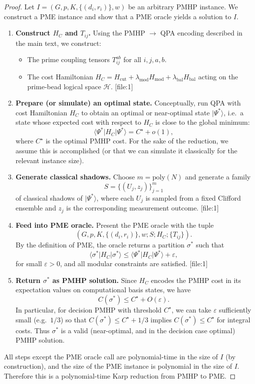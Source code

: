 \documentclass[11pt]{article}
\begin{document}
\begin{proof}
Let $I = (G,p,K,\{(d_i,r_i)\},w)$ be an arbitrary PMHP instance. We construct a PME instance and show that a PME oracle yields a solution to $I$.

\begin{enumerate}[label=(\arabic*)]
  \item \textbf{Construct $H_C$ and $T_{ij}$.} Using the PMHP $\to$ QPA encoding described in the main text, we construct:
  \begin{itemize}
    \item The prime coupling tensors $T_{ij}^{ab}$ for all $i,j,a,b$.
    \item The cost Hamiltonian $H_C = H_{\text{cut}} + \lambda_{\text{mod}}H_{\text{mod}} + \lambda_{\text{bal}}H_{\text{bal}}$ acting on the prime-bead logical space $\mathcal{H}$. [file:1]
  \end{itemize}

  \item \textbf{Prepare (or simulate) an optimal state.} Conceptually, run QPA with cost Hamiltonian $H_C$ to obtain an optimal or near-optimal state $|\Psi^*\rangle$, i.e.\ a state whose expected cost with respect to $H_C$ is close to the global minimum:
  \[
    \langle \Psi^*|H_C|\Psi^*\rangle = C^\star + o(1),
  \]
  where $C^\star$ is the optimal PMHP cost. For the sake of the reduction, we assume this is accomplished (or that we can simulate it classically for the relevant instance size).

  \item \textbf{Generate classical shadows.} Choose $m = \mathrm{poly}(N)$ and generate a family
  \[
    S = \{(U_j,z_j)\}_{j=1}^m
  \]
  of classical shadows of $|\Psi^*\rangle$, where each $U_j$ is sampled from a fixed Clifford ensemble and $z_j$ is the corresponding measurement outcome. [file:1]

  \item \textbf{Feed into PME oracle.} Present the PME oracle with the tuple
  \[
    (G,p,K,\{(d_i,r_i)\},w; S; H_C; \{T_{ij}\}).
  \]
  By the definition of PME, the oracle returns a partition $\sigma^*$ such that
  \[
    \langle \sigma^*|H_C|\sigma^*\rangle \le \langle \Psi^*|H_C|\Psi^*\rangle + \varepsilon,
  \]
  for small $\varepsilon > 0$, and all modular constraints are satisfied. [file:1]

  \item \textbf{Return $\sigma^*$ as PMHP solution.} Since $H_C$ encodes the PMHP cost in its expectation values on computational basis states, we have
  \[
    C(\sigma^*) \le C^\star + O(\varepsilon).
  \]
  In particular, for decision PMHP with threshold $C^\star$, we can take $\varepsilon$ sufficiently small (e.g.\ $1/3$) so that $C(\sigma^*) \le C^\star + 1/3$ implies $C(\sigma^*) \le C^\star$ for integral costs. Thus $\sigma^*$ is a valid (near-optimal, and in the decision case optimal) PMHP solution.
\end{enumerate}

All steps except the PME oracle call are polynomial-time in the size of $I$ (by construction), and the size of the PME instance is polynomial in the size of $I$. Therefore this is a polynomial-time Karp reduction from PMHP to PME.
\end{proof}
\end{document}
